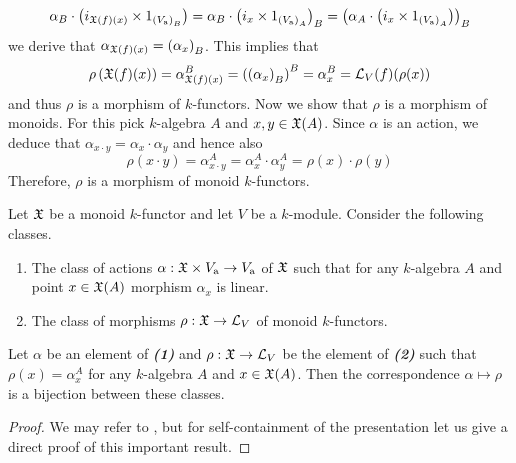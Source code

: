 $$\alpha_B\cdot \left(i_{{\mathfrak X}(f)(x)}\times 1_{\left(V_{\mathrm{a}}\right)_B}\right) = \alpha_B\cdot \left(i_{x}\times 1_{\left(V_{\mathrm{a}}\right)_A}\right)_B = \left(\alpha_A\cdot \left(i_{x}\times 1_{\left(V_{\mathrm{a}}\right)_A}\right)\right)_B$$
we derive that $\alpha_{{\mathfrak X}(f)(x)} = \left(\alpha_x\right)_B$. This implies that
$$\rho\left({\mathfrak X}(f)(x)\right) = \alpha_{{\mathfrak X}(f)(x)}^B = \left(\left(\alpha_x\right)_B\right)^B= \alpha_x^B = {\mathcal L}_V(f)(\rho(x))$$
and thus $\rho$ is a morphism of $k$-functors. Now we show that $\rho$ is a morphism of monoids. For this pick $k$-algebra $A$ and $x, y\in {\mathfrak X}(A)$. Since $\alpha$ is an action, we deduce that $\alpha_{x \cdot y} = \alpha_x\cdot \alpha_y$ and hence also
$$\rho(x\cdot y) = \alpha^A_{x \cdot y} = \alpha^A_x\cdot \alpha^A_y = \rho(x)\cdot \rho(y)$$
Therefore, $\rho$ is a morphism of monoid $k$-functors.

\begin{theorem}\label{theorem:characterizationsoflinearrepresentations}
Let ${\mathfrak X}$ be a monoid $k$-functor and let $V$ be a $k$-module. Consider the following classes. 
\begin{enumerate}[label=\emph{\textbf{(\arabic*)}}, leftmargin=1.5em]
\item The class of actions $\alpha:{\mathfrak X}\times V_{\mathrm{a}}\rightarrow V_{\mathrm{a}}$ of ${\mathfrak X}$ such that for any $k$-algebra $A$ and point $x\in {\mathfrak X}(A)$ morphism $\alpha_x$ is linear.
\item The class of morphisms $\rho:{\mathfrak X}\rightarrow {\mathcal L}_V$ of monoid $k$-functors.
\end{enumerate}
Let $\alpha$ be an element of \emph{\textbf{(1)}} and $\rho:{\mathfrak X}\rightarrow {\mathcal L}_V$ be the element of \emph{\textbf{(2)}} such that $\rho(x) = \alpha_x^A$ for any $k$-algebra $A$ and $x\in {\mathfrak X}(A)$. Then the correspondence $\alpha \mapsto \rho$ is a bijection between these classes.
\end{theorem}
\begin{proof}
We may refer to {\cite[Theorem 6.3]{Presheaves}}, but for self-containment of the presentation let us give a direct proof of this important result.
\end{proof}




\small




